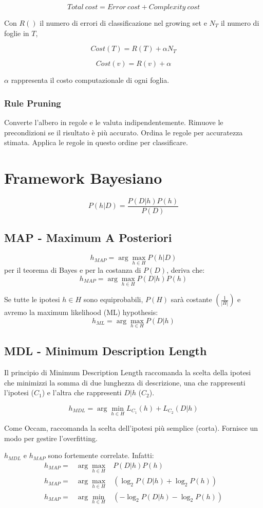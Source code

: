 \documentclass[11pt,onecolumn,a4paper,oneside]{book}
\begin{document}
$$Total~cost = Error~cost + Complexity~cost$$

Con $R()$ il numero di errori di classificazione nel growing set e $N_T$ il numero di foglie in $T$,

$$Cost(T) = R(T) + \alpha N_T$$

$$Cost(v) = R(v) + \alpha $$

$\alpha$ rappresenta il costo computazionale di ogni foglia.

\subsection{Rule Pruning}
Converte l'albero in regole e le valuta indipendentemente.
Rimuove le precondizioni se il risultato è più accurato.
Ordina le regole per accuratezza stimata. Applica le regole in questo ordine per classificare.


\chapter{Framework Bayesiano}

$$P(h|D)=\frac{P(D|h)P(h)}{P(D)}$$


\section{MAP - Maximum A Posteriori}
$$h_{MAP} = \arg\max_{h \in H} P(h|D)$$
per il teorema di Bayes e per la costanza di $P(D)$, deriva che:
$$h_{MAP} = \arg\max_{h \in H} P(D|h)P(h)$$

Se tutte le ipotesi $h \in H$ sono equiprobabili, $P(H)$ sarà costante $\left( \frac{1}{|H|} \right)$ e avremo la maximum likelihood (ML) hypothesis:
$$h_{ML} = \arg\max_{h\in H} P(D|h)$$


\section{MDL - Minimum Description Length}
Il principio di Minimum Description Length raccomanda la scelta della ipotesi che minimizzi la somma di due lunghezza di descrizione, una che rappresenti l'ipotesi ($C_1$) e l'altra che rappresenti $D|h$ ($C_2$).

$$h_{MDL} = \arg\min_{h\in H} L_{C_{1}}(h) + L_{C_{2}}(D|h)$$

Come Occam, raccomanda la scelta dell'ipotesi più semplice (corta).
Fornisce un modo per gestire l'overfitting.

$h_{MDL}$ e $h_{MAP}$ sono fortemente correlate.
Infatti:
\begin{eqnarray*}
h_{MAP} = & \arg\max\limits_{h \in H} & P(D|h)P(h) \\
h_{MAP} = & \arg\max\limits_{h \in H} & \left( \log_{2} P(D|h) + \log_{2} P(h) \right) \\
h_{MAP} = & \arg\min\limits_{h \in H} & \left( - \log_{2} P(D|h) - \log_{2} P(h) \right) \\
\end{eqnarray*}
\end{document}
